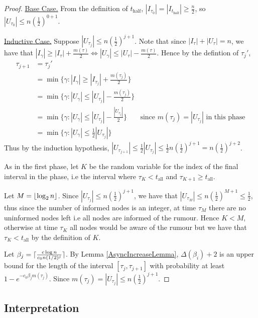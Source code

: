 \documentclass[a4paper,11pt]{article}
\theoremstyle{definition}
\DeclarePairedDelimiter\ceil{\lceil}{\rceil}
\DeclarePairedDelimiter\floor{\lfloor}{\rfloor}
\begin{document}
\begin{proof}
	\underline{Base Case.}
	From the definition of $t_\text{half}$, $|I_{\tau_0}| = |I_{t_\text{half}}| \geq \frac{n}{2}$, so $|U_{\tau_0}| \leq n(\frac{1}{2})^{0+1}$.

	\underline{Inductive Case.} Suppose $|U_{\tau_j}| \leq n(\frac{1}{2})^{j+1}$. Note that since $|I_\tau| + |U_\tau| = n$, we have that $|I_{\gamma}| \geq |I_\tau| + \frac{m(\tau)}{2} \iff |U_\gamma| \leq |U_\tau| - \frac{m(\tau)}{2}$. Hence by the defintion of $\tau_j'$,
	\begin{align*}
		\tau_{j+1} &= \tau_j' \\
		&= \min \{ \gamma : |I_\gamma| \geq |I_{\tau_j}| + \frac{m(\tau_j)}{2}\} \\
		&= \min \{ \gamma : |U_\gamma| \leq |U_{\tau_j}| - \frac{m(\tau_j)}{2}\} \\
		&= \min \{ \gamma : |U_\gamma| \leq |U_{\tau_j}| - \frac{|U_{\tau_j}|}{2}\} & \text{since } m(\tau_j) = |U_{\tau_j}| \text{ in this phase} \\
		&= \min \{ \gamma : |U_\gamma| \leq \frac{1}{2}|U_{\tau_j}|\}
	\end{align*}
	Thus by the induction hypothesis, $|U_{\tau_{j+1}}| \leq \frac{1}{2}|U_{\tau_j}| \leq \frac{1}{2}n(\frac{1}{2})^{j+1} = n(\frac{1}{2})^{j+2}$.

	As in the first phase, let $K$ be the random variable for the index of the final interval in the phase, i.e the interval where $\tau_K < t_\text{all}$ and $\tau_{K+1} \geq t_\text{all}$.

	Let $M = \floor{\log_2 n}$. Since $|U_{\tau_j}| \leq n(\frac{1}{2})^{j+1}$, we have that $|U_{\tau_M}| \leq n(\frac{1}{2})^{M+1} \leq \frac{1}{2}$, thus since the number of informed nodes is an integer, at time $\tau_M$ there are no uninformed nodes left i.e all nodes are informed of the rumour. Hence $K < M$, otherwise at time $\tau_K$ all nodes would be aware of the rumour but we have that $\tau_K < t_\text{all}$ by the definition of $K$.

	Let $\beta_j = \ceil{\frac{c \log n}{c_0 n(1/2)^j}}$. %
	By Lemma \ref{AsyncIncreaseLemma}, $\Delta(\beta_i) + 2$ is an upper bound for the length of the interval $[\tau_j, \tau_{j+1}]$ 
	with probability at least $1 - e^{-c_0\beta_j m(\tau_j)}$. %
	Since $m(\tau_j) = |U_{\tau_j}| \leq n(\frac{1}{2})^{j+1}$.

\end{proof}
\subsection{Interpretation}
\end{document}
